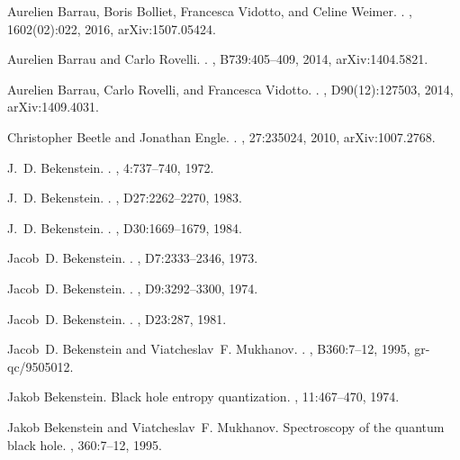 \documentclass[aps, nofootinbib,superscriptaddress,12pt]{revtex4-2}
\begin{document}
\begin{thebibliography}{100}
Aurelien Barrau, Boris Bolliet, Francesca Vidotto, and Celine Weimer.
.
, 1602(02):022, 2016, arXiv:1507.05424.

Aurelien Barrau and Carlo Rovelli.
.
, B739:405--409, 2014, arXiv:1404.5821.

Aurelien Barrau, Carlo Rovelli, and Francesca Vidotto.
.
, D90(12):127503, 2014, arXiv:1409.4031.

Christopher Beetle and Jonathan Engle.
.
, 27:235024, 2010, arXiv:1007.2768.

J.~D. Bekenstein.
.
, 4:737--740, 1972.

J.~D. Bekenstein.
.
, D27:2262--2270, 1983.

J.~D. Bekenstein.
.
, D30:1669--1679, 1984.

Jacob~D. Bekenstein.
.
, D7:2333--2346, 1973.

Jacob~D. Bekenstein.
.
, D9:3292--3300, 1974.

Jacob~D. Bekenstein.
.
, D23:287, 1981.

Jacob~D. Bekenstein and Viatcheslav~F. Mukhanov.
.
, B360:7--12, 1995, gr-qc/9505012.

Jakob Bekenstein.
\newblock Black hole entropy quantization.
, 11:467--470, 1974.

Jakob Bekenstein and Viatcheslav~F. Mukhanov.
\newblock Spectroscopy of the quantum black hole.
, 360:7--12, 1995.


\end{thebibliography}
\end{document}
